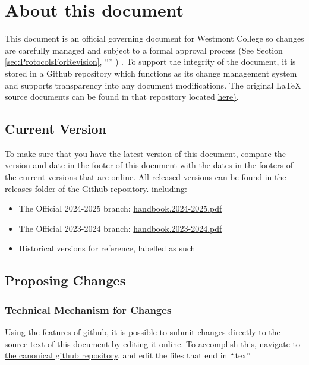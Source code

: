 \section{About this document}
	\label{sec:AboutThisDocument}

	This document is an official governing document for Westmont College so changes are carefully managed and subject to a formal approval process
	(See Section
	\ref{sec:ProtocolsForRevision},
	``''
	) .
	To support the integrity of the document, it is stored in a Github repository which functions as its change management system and supports transparency into any document modifications.
	The original LaTeX source documents can be found in that repository located
	\href{https://github.com/djp3/WestmontFacultyHandbook}{here)}.



	\subsection{Current Version}


		To make sure that you have the latest version of this document, compare the version and date in the
		footer of this document with the dates in the footers of the current versions that are online.
		All released versions can be found in
		\href{https://github.com/djp3/WestmontFacultyHandbook/tree/main/releases}{the releases} folder of the Github repository.
		including:
		\begin{itemize}
			\item{The Official 2024-2025 branch: \href{https://github.com/djp3/WestmontFacultyHandbook/tree/Official-2024-2025-RC/releases}{handbook.2024-2025.pdf}}
			\item{The Official 2023-2024 branch: \href{https://github.com/djp3/WestmontFacultyHandbook/tree/Official-2023-2024-RC/releases}{handbook.2023-2024.pdf}}
			\item{Historical versions for reference, labelled as such}
		\end{itemize}

	\subsection{Proposing Changes}
		\subsubsection{Technical Mechanism for Changes}
			Using the features of github, it is possible to submit changes
			directly to the source text of this document by editing
			it online. To accomplish this,
			navigate to
			\href{https://github.com/djp3/WestmontFacultyHandbook}{the canonical github repository}.
			and
			edit the files that end in ``.tex''

